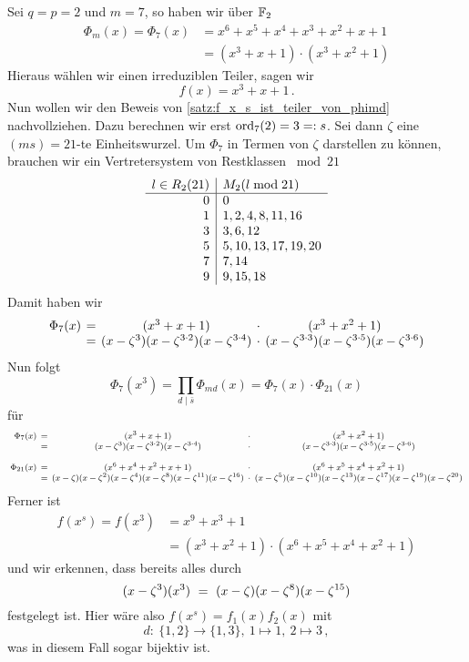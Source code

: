 \begin{beispiel}
  Sei $q = p = 2$ und $m = 7$, so haben wir über $\mathbb{F}_2$
  \begin{align*}
    \Phi_m(x) = \Phi_7(x) &= 
      x^{6} + x^{5} + x^{4} + x^{3} + x^{2} + x + 1 \\
    &= (x^{3} + x + 1) \cdot (x^{3} + x^{2} + 1)
  \end{align*}
  Hieraus wählen wir einen irreduziblen Teiler, sagen wir
  \[ f(x) = x^3 + x +1\,.\]
  Nun wollen wir den Beweis von \cref{satz:f_x_s_ist_teiler_von_phimd}
  nachvollziehen. Dazu berechnen wir erst $\operatorname{ord}_7(2) = 3  =: s$. 
  Sei dann $\zeta$ eine 
  $(ms) = 21$-te Einheitswurzel. Um $\Phi_7$ in Termen von $\zeta$ darstellen
  zu können, brauchen wir ein Vertretersystem von Restklassen ${}\bmod 21$
  \[\begin{array}[t]{r|l}
    l \in R_2(21) & M_2(l \bmod 21) \\\hline
    0 & 0 \\
    1 & 1, 2, 4, 8, 11, 16 \\
    3 & 3, 6, 12 \\
    5 & 5, 10, 13, 17, 19, 20 \\
    7 & 7, 14 \\
    9 & 9, 15, 18
  \end{array}\]
  Damit haben wir 
  \[ \setlength{\arraycolsep}{2pt}\begin{array}{rcccc}
    \Phi_7(x) &=& (x^{3} + x + 1) &\cdot& (x^{3} + x^{2} + 1) \\
      &=& (x-\zeta^3)(x-\zeta^{3\cdot 2})(x-\zeta^{3\cdot 4}) &\cdot&
        (x-\zeta^{3\cdot 3})(x-\zeta^{3\cdot 5})(x-\zeta^{3\cdot 6})
  \end{array}\]
  Nun folgt 
  \[\Phi_7(x^3) 
        = \prod_{d \mid \bar s} \Phi_{md}(x) = \Phi_7(x) \cdot \Phi_{21}(x)\]
  für 
  \[\footnotesize\setlength{\arraycolsep}{2pt}\everymath{\displaystyle}
    \begin{array}{rcccc} 
      \Phi_7(x)&=& (x^{3} + x + 1) &\cdot& (x^{3} + x^{2} + 1) \\
      &=& (x-\zeta^3)(x-\zeta^{3\cdot 2})(x-\zeta^{3\cdot 4}) &\cdot&
        (x-\zeta^{3\cdot 3})(x-\zeta^{3\cdot 5})(x-\zeta^{3\cdot 6}) \\[10pt]
      \Phi_{21}(x) &=& (x^{6} + x^{4} + x^{2} + x + 1) 
        &\cdot& (x^{6} + x^{5} + x^{4} + x^{2} + 1) \\
      &=& (x-\zeta)(x-\zeta^2)(x-\zeta^4)(x-\zeta^8)(x-\zeta^{11})
        (x-\zeta^{16}) &\cdot&
        (x-\zeta^5)(x-\zeta^{10})(x-\zeta^{13})(x-\zeta^{17})
        (x-\zeta^{19})(x-\zeta^{20}) 
    \end{array}\]
  Ferner ist 
  \begin{align*}
    f(x^s) = f(x^3) &= x^{9} + x^{3} + 1\\
    &= (x^{3} + x^{2} + 1) \cdot (x^{6} + x^{5} + x^{4} + x^{2} + 1)
  \end{align*}
  und wir erkennen, dass bereits alles durch
  \[ (x-\zeta^3)(x^3) \ =\  (x-\zeta) (x-\zeta^8) (x-\zeta^{15})\]
  festgelegt ist.
  Hier wäre also $f(x^s) = f_1(x)f_2(x)$ mit 
  \[ d:\ \{1,2\} \to \{1,3\},\ 1\mapsto 1,\ 2\mapsto 3\,,\]
  was in diesem Fall sogar bijektiv ist.
\end{beispiel}

